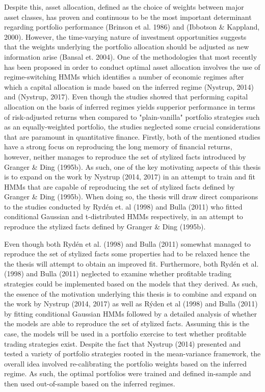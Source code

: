 Despite this, asset allocation, defined as the choice of weights between major asset classes, has proven and continuous to be the most important determinant regarding portfolio performance (Brinson et al. 1986) and (Ibbotson \& Kappland, 2000). However, the time-varying nature of investment opportunities suggests that the weights underlying the portfolio allocation should be adjusted as new information arise (Bansal et. 2004). One of the methodologies that most recently has been proposed in order to conduct optimal asset allocation involves the use of regime-switching HMMs which identifies a number of economic regimes after which a capital allocation is made based on the inferred regime (Nystrup, 2014) and (Nystrup, 2017). Even though the studies showed that performing capital allocation on the basis of inferred regimes yields supperior performance in terms of risk-adjusted returns when compared to "plain-vanilla" portfolio strategies such as an equally-weighted portfolio, the studies neglected some crucial considerations that are paramount in quantitative finance. Firstly, both of the mentioned studies have a strong focus on reproducing the long memory of financial returns, however, neither manages to reproduce the set of stylized facts introduced by Granger \& Ding (1995b). As such, one of the key motivating aspects of this thesis is to expand on the work by Nystrup (2014, 2017) in an attempt to train and fit HMMs that are capable of reproducing the set of stylized facts defined by Granger \& Ding (1995b). When doing so, the thesis will draw direct comparisons to the studies conducted by Rydén et. al (1998) and Bulla (2011) who fitted conditional Gaussian and t-distributed HMMs respectively, in an attempt to reproduce the stylized facts defined by Granger \& Ding (1995b). 

Even though both Rydén et al. (1998) and Bulla (2011) somewhat managed to reproduce the set of stylized facts some properties had to be relaxed hence the the thesis will attempt to obtain an improved fit. Furthermore, both Rydén et al. (1998) and Bulla (2011) neglected to examine whether profitable trading strategies could be implemented based on the models that they derived. As such, the essence of the motivation underlying this thesis is to combine and expand on the work by Nystrup (2014, 2017) as well as Rýden et al (1998) and Bulla (2011) by fitting conditional Gaussian HMMs followed by a detailed analysis of whether the models are able to reproduce the set of stylized facts. Assuming this is the case, the models will be used in a portfolio exercise to test whether profitable trading strategies exist. Despite the fact that Nystrup (2014) presented and tested a variety of portfolio strategies rooted in the mean-variance framework, the overall idea involved re-calibrating the portfolio weights based on the inferred regime. As such, the optimal portfolios were trained and defined in-sample and then used out-of-sample based on the inferred regimes. 

